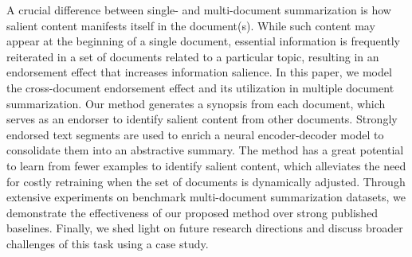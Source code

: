 A crucial difference between single- and multi-document summarization is how salient content manifests itself in the document(s). While such content may appear at the beginning of a single document, essential information is frequently reiterated in a set of documents related to a particular topic, resulting in an endorsement effect that increases information salience. In this paper, we model the cross-document endorsement effect and its utilization in multiple document summarization. Our method generates a synopsis from each document, which serves as an endorser to identify salient content from other documents. Strongly endorsed text segments are used to enrich a neural encoder-decoder model to consolidate them into an abstractive summary. The method has a great potential to learn from fewer examples to identify salient content, which alleviates the need for costly retraining when the set of documents is dynamically adjusted. Through extensive experiments on benchmark multi-document summarization datasets, we demonstrate the effectiveness of our proposed method over strong published baselines. Finally, we shed light on future research directions and discuss broader challenges of this task using a case study.
